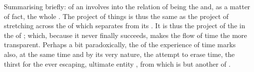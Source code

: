\pa%
Summarising briefly:  of an
 involves  into the relation of being  the
 and, as a matter of fact,  the whole . The
 project of  things is thus the same as the
project of stretching across the  of  which separates
 from its . It is thus the project of 
the  in the  of ; 
which, because it never finally succeeds, makes the flow of time the more
transparent. Perhaps a bit paradoxically, the  of the experience
of time marks also, at the same time and by its very nature, the attempt to
erase time, the thirst for the ever escaping, ultimate entity ,
 from which is but another  of . 

